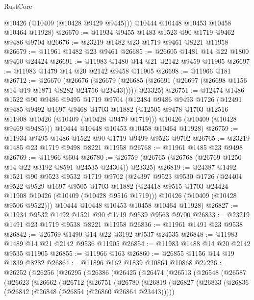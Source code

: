 \begin{lexlean}{RustCore}
\begin{coremodule}
        @10426
        (@10409 (@10428 @9429 @9445)))
      @10444
      @10448
      @10453
      @10458
      @10464
      @11928)
@26670 := @11934 @9455 @1483 @1523 @90 @1719 @9462 @9486 @9704
@26676 := @23219 @1482 @23 @1719 @9461 @8221 @11958
@26679 := @11961 @1482 @23 @9461
@26685 := @26605 @1481 @14 @22 @1800 @9460 @24424
@26691 := @11983 @1480 @14 @21 @2142 @9459 @11905
@26697 := @11983 @1479 @14 @20 @2142 @9458 @11905
@26698 := @11966 @181
@26712 := @26670
    (@26676
      (@26679 (@26685 (@26691 (@26697 (@26698 @1156 @14 @19 @1871 @8282 @24756 @23443)))))
      @23325)
@26751 := @12474
    @1486
    @1522
    @90
    @9486
    @9495
    @1719
    @9704
    (@12484
      @9486
      @9493
      @1726
      (@12491
        @9485
        @9492
        @1697
        @9468
        @1703
        @11882
        (@12505 @9478 @1703 @12516 @11908 @10426 (@10409 (@10428 @9479 @1719)))
        @10426
        (@10409 (@10428 @9469 @9485)))
      @10444
      @10448
      @10453
      @10458
      @10464
      @11928)
@26759 := @11934 @9495 @1486 @1522 @90 @1719 @9499 @9523 @9702
@26765 := @23219 @1485 @23 @1719 @9498 @8221 @11958
@26768 := @11961 @1485 @23 @9498
@26769 := @11966 @604
@26780 := @26759 (@26765 (@26768 (@26769 @1250 @14 @22 @3192 @8591 @24535 @24304)) @23325)
@26819 := @24387
    @1492
    @1521
    @90
    @9523
    @9532
    @1719
    @9702
    (@24397
      @9523
      @9530
      @1726
      (@24404
        @9522
        @9529
        @1697
        @9505
        @1703
        @11882
        (@24418 @9515 @1703 @24424 @11908 @10426 (@10409 (@10428 @9516 @1719)))
        @10426
        (@10409 (@10428 @9506 @9522)))
      @10444
      @10448
      @10453
      @10458
      @10464
      @11928)
@26827 := @11934 @9532 @1492 @1521 @90 @1719 @9539 @9563 @9700
@26833 := @23219 @1491 @23 @1719 @9538 @8221 @11958
@26836 := @11961 @1491 @23 @9538
@26842 := @26769 @1490 @14 @22 @3192 @9537 @24535
@26848 := @11983 @1489 @14 @21 @2142 @9536 @11905
@26854 := @11983 @1488 @14 @20 @2142 @9535 @11905
@26855 := @11966 @163
@26860 := @26855 @1156 @14 @19 @1839 @8282
@26864 := @11896 @162 @1839 @10864 @10868
@27226 := @26252
    (@26256
      (@26295
        (@26386
          (@26425
            (@26474
              (@26513
                (@26548
                  (@26587
                    (@26623
                      (@26662
                        (@26712
                          (@26751
                            (@26780
                              (@26819
                                (@26827
                                  (@26833
                                    (@26836 (@26842 (@26848 (@26854 (@26860 @26864 @23443)))))

\end{coremodule}
\end{lexlean}
